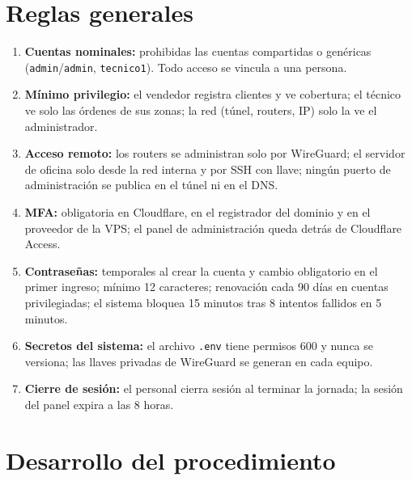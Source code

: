 \section{Reglas generales}
\begin{enumerate}
  \item \textbf{Cuentas nominales:} prohibidas las cuentas compartidas o genéricas
  (\texttt{admin}/\texttt{admin}, \texttt{tecnico1}). Todo acceso se vincula a una persona.
  \item \textbf{Mínimo privilegio:} el vendedor registra clientes y ve cobertura; el técnico ve
  solo las órdenes de sus zonas; la red (túnel, routers, IP) solo la ve el administrador.
  \item \textbf{Acceso remoto:} los routers se administran solo por WireGuard; el servidor de
  oficina solo desde la red interna y por SSH con llave; ningún puerto de administración
  se publica en el túnel ni en el DNS.
  \item \textbf{MFA:} obligatoria en Cloudflare, en el registrador del dominio y en el
  proveedor de la VPS; el panel de administración queda detrás de Cloudflare Access.
  \item \textbf{Contraseñas:} temporales al crear la cuenta y cambio obligatorio en el primer
  ingreso; mínimo 12 caracteres; renovación cada 90 días en cuentas privilegiadas; el sistema
  bloquea 15 minutos tras 8 intentos fallidos en 5 minutos.
  \item \textbf{Secretos del sistema:} el archivo \texttt{.env} tiene permisos 600 y nunca se
  versiona; las llaves privadas de WireGuard se generan en cada equipo.
  \item \textbf{Cierre de sesión:} el personal cierra sesión al terminar la jornada; la sesión
  del panel expira a las 8 horas.
\end{enumerate}

\section{Desarrollo del procedimiento}

